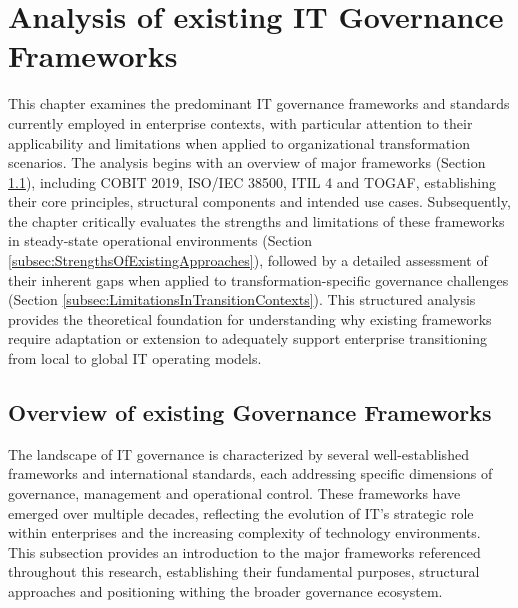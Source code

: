 \newpage
\section{Analysis of existing IT Governance Frameworks}
\label{sec:AnalysisOfExistingITGovernanceFrameworks}
This chapter examines the predominant IT governance frameworks and standards currently employed in enterprise contexts, with particular attention to their applicability and limitations when applied to organizational transformation scenarios.
The analysis begins with an overview of major frameworks (Section \ref{subsec:OverviewOfExistingGovernanceFrameworks}), including COBIT 2019, ISO/IEC 38500, ITIL 4 and TOGAF, establishing their core principles, structural components and intended use cases.
Subsequently, the chapter critically evaluates the strengths and limitations of these frameworks in steady-state operational environments (Section \ref{subsec:StrengthsOfExistingApproaches}), followed by a detailed assessment of their inherent gaps when applied to transformation-specific governance challenges (Section \ref{subsec:LimitationsInTransitionContexts}).
This structured analysis provides the theoretical foundation for understanding why existing frameworks require adaptation or extension to adequately support enterprise transitioning from local to global IT operating models.

\subsection{Overview of existing Governance Frameworks}
\label{subsec:OverviewOfExistingGovernanceFrameworks}
The landscape of IT governance is characterized by several well-established frameworks and international standards, each addressing specific dimensions of governance, management and operational control.
These frameworks have emerged over multiple decades, reflecting the evolution of IT's strategic role within enterprises and the increasing complexity of technology environments.
This subsection provides an introduction to the major frameworks referenced throughout this research, establishing their fundamental purposes, structural approaches and positioning withing the broader governance ecosystem.

